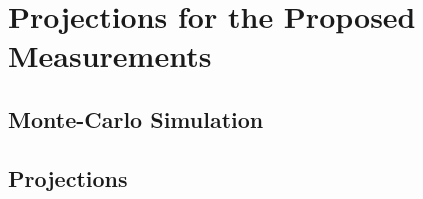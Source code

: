 \chapter{Projections for the Proposed Measurements}
\label{chap:reach}

\section{Monte-Carlo Simulation}

\section{Projections}

